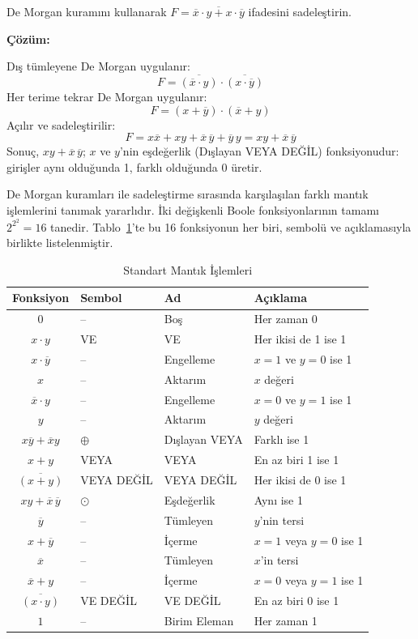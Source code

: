 \begin{ornek}[B.2]
De Morgan kuramını kullanarak $F = \overline{\overline{x} \cdot y + x \cdot \overline{y}}$ ifadesini sadeleştirin.

\textbf{Çözüm:}

Dış tümleyene De Morgan uygulanır:
\[
F = \overline{(\overline{x} \cdot y)} \cdot \overline{(x \cdot \overline{y})}
\]
Her terime tekrar De Morgan uygulanır:
\[
F = (x + \overline{y}) \cdot (\overline{x} + y)
\]
Açılır ve sadeleştirilir:
\[
F = x\overline{x} + xy + \overline{x}\,\overline{y} + \overline{y}\,y = xy + \overline{x}\,\overline{y}
\]
Sonuç, $xy + \overline{x}\,\overline{y}$; $x$ ve $y$'nin eşdeğerlik (Dışlayan VEYA DEĞİL) fonksiyonudur: girişler aynı olduğunda 1, farklı olduğunda 0 üretir.
\end{ornek}

De Morgan kuramları ile sadeleştirme sırasında karşılaşılan farklı mantık işlemlerini tanımak yararlıdır. İki değişkenli Boole fonksiyonlarının tamamı $2^{2^2} = 16$ tanedir. Tablo~\ref{tab:B.5}'te bu 16 fonksiyonun her biri, sembolü ve açıklamasıyla birlikte listelenmiştir.

\begin{table}[H]
\centering
\caption{Standart Mantık İşlemleri}
\label{tab:B.5}
\begin{tabular}{clll}
\toprule
\textbf{Fonksiyon} & \textbf{Sembol} & \textbf{Ad} & \textbf{Açıklama} \\
\midrule
$0$ & -- & Boş & Her zaman 0 \\
$x \cdot y$ & VE & VE & Her ikisi de 1 ise 1 \\
$x \cdot \overline{y}$ & -- & Engelleme & $x=1$ ve $y=0$ ise 1 \\
$x$ & -- & Aktarım & $x$ değeri \\
$\overline{x} \cdot y$ & -- & Engelleme & $x=0$ ve $y=1$ ise 1 \\
$y$ & -- & Aktarım & $y$ değeri \\
$x\overline{y} + \overline{x}y$ & $\oplus$ & Dışlayan VEYA & Farklı ise 1 \\
$x + y$ & VEYA & VEYA & En az biri 1 ise 1 \\
$\overline{(x + y)}$ & VEYA DEĞİL & VEYA DEĞİL & Her ikisi de 0 ise 1 \\
$x y + \overline{x}\,\overline{y}$ & $\odot$ & Eşdeğerlik & Aynı ise 1 \\
$\overline{y}$ & -- & Tümleyen & $y$'nin tersi \\
$x + \overline{y}$ & -- & İçerme & $x=1$ veya $y=0$ ise 1 \\
$\overline{x}$ & -- & Tümleyen & $x$'in tersi \\
$\overline{x} + y$ & -- & İçerme & $x=0$ veya $y=1$ ise 1 \\
$\overline{(x \cdot y)}$ & VE DEĞİL & VE DEĞİL & En az biri 0 ise 1 \\
$1$ & -- & Birim Eleman & Her zaman 1 \\
\bottomrule
\end{tabular}
\end{table}


